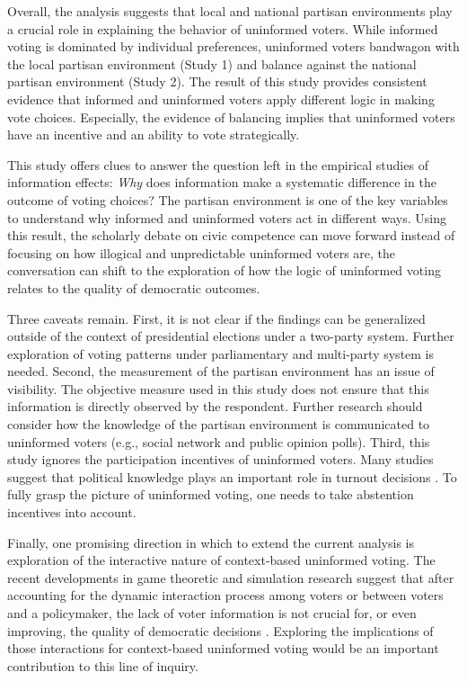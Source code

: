 \documentclass[letterpaper, 12pt]{article}
\begin{document}
    \par Overall, the analysis suggests that local and national partisan environments play a crucial role in explaining the behavior of uninformed voters. While informed voting is dominated by individual preferences, uninformed voters bandwagon with the local partisan environment (Study 1) and balance against the national partisan environment (Study 2). The result of this study provides consistent evidence that informed and uninformed voters apply different logic in making vote choices. Especially, the evidence of balancing implies that uninformed voters have an incentive and an ability to vote strategically.
    
    \par This study offers clues to answer the question left in the empirical studies of information effects: \textit{Why} does information make a systematic difference in the outcome of voting choices? The partisan environment is one of the key variables to understand why informed and uninformed voters act in different ways. Using this result, the scholarly debate on civic competence can move forward instead of focusing on how illogical and unpredictable uninformed voters are, the conversation can shift to the exploration of how the logic of uninformed voting relates to the quality of democratic outcomes. 
    
    \par Three caveats remain. First, it is not clear if the findings can be generalized outside of the context of presidential elections under a two-party system. Further exploration of voting patterns under parliamentary and multi-party system is needed. Second, the measurement of the partisan environment has an issue of visibility. The objective measure used in this study does not ensure that this information is directly observed by the respondent. Further research should consider how the knowledge of the partisan environment is communicated to uninformed voters (e.g., social network and public opinion polls). Third, this study ignores the participation incentives of uninformed voters. Many studies suggest that political knowledge plays an important role in turnout decisions \citep{Matsusaka1995exvo, Dellicarpini1996wham, Feddersen1996thsw, Lassen2005thef, Larcinese2007dopo, Gemenis2014voad}. To fully grasp the picture of uninformed voting, one needs to take abstention incentives into account.
    
    \par Finally, one promising direction in which to extend the current analysis is exploration of the interactive nature of context-based uninformed voting. The recent developments in game theoretic and simulation research suggest that after accounting for the dynamic interaction process among voters or between voters and a policymaker, the lack of voter information is not crucial for, or even improving, the quality of democratic decisions \citep{Ashworth2014isvo, Couzin2011unin}. Exploring the implications of those interactions for context-based uninformed voting would be an important contribution to this line of inquiry. 
    
\end{document}
